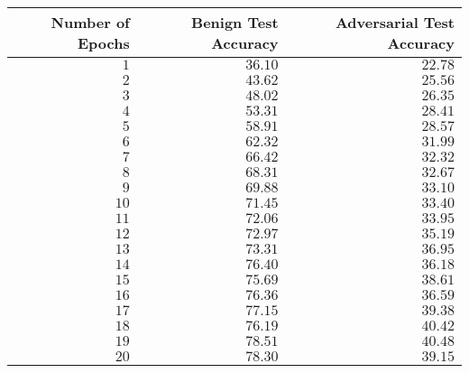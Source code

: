 \documentclass[11pt, reqno]{amsart}
\begin{document}
\newpage


\begin{table}[h!]
    \centering
    \begin{tabular}{| r | r | r |}
      \bottomrule
      \textbf{Number of Epochs}   & \textbf{Benign Test Accuracy}  & \textbf{Adversarial Test Accuracy} \\   
      \midrule
      $1$                         & $36.10$                 & $22.78$ \\
      $2$                         & $43.62$                 & $25.56$ \\
      $3$                         & $48.02$                 & $26.35$ \\
      $4$                         & $53.31$                 & $28.41$ \\
      $5$                         & $58.91$                 & $28.57$ \\
      $6$                         & $62.32$                 & $31.99$ \\
      $7$                         & $66.42$                 & $32.32$ \\
      $8$                         & $68.31$                 & $32.67$ \\
      $9$                         & $69.88$                 & $33.10$ \\
      $10$                        & $71.45$                 & $33.40$ \\
      $11$                        & $72.06$                 & $33.95$ \\
      $12$                        & $72.97$                 & $35.19$ \\
      $13$                        & $73.31$                 & $36.95$ \\
      $14$                        & $76.40$                 & $36.18$ \\
      $15$                        & $75.69$                 & $38.61$ \\
      $16$                        & $76.36$                 & $36.59$ \\
      $17$                        & $77.15$                 & $39.38$ \\
      $18$                        & $76.19$                 & $40.42$ \\
      $19$                        & $78.51$                 & $40.48$ \\
      $20$                        & $78.30$                 & $39.15$ \\

\end{tabular}
\end{table}
\end{document}
